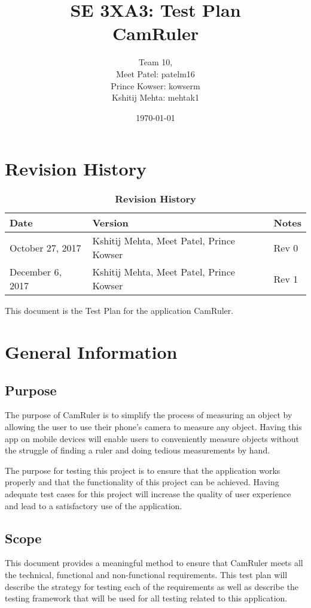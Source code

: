 \documentclass[12pt, titlepage]{article}
\title{SE 3XA3: Test Plan\\CamRuler}
\author{Team 10,
		\\ Meet Patel: patelm16
		\\ Prince Kowser: kowserm
		\\ Kshitij Mehta: mehtak1
}
\date{\today}
\begin{document}
\maketitle

\tableofcontents
\listoftables
\listoffigures

\newpage
 \section{Revision History}
\begin{table}[H]
\caption{\bf Revision History}
\begin{tabularx}{\textwidth}{p{4cm}p{2cm}X}
\toprule {\bf Date} & {\bf Version} & {\bf Notes}\\
\midrule
\midrule
October 27, 2017 & Kshitij Mehta, Meet Patel, Prince Kowser & Rev 0\\
\midrule
December 6, 2017 & Kshitij Mehta, Meet Patel, Prince Kowser & Rev 1\\
\bottomrule
\end{tabularx}
\end{table}

This document is the Test Plan for the application CamRuler.

\newpage


\section{General Information}

\subsection{Purpose}
The purpose of CamRuler is to simplify the process of measuring an object by allowing the user to use their phone’s camera to measure any object. Having this app on mobile devices will enable users to conveniently measure objects without the struggle of ﬁnding a ruler and doing tedious measurements by hand.

\noindent The purpose for testing this project is to ensure that the application works properly and that the functionality of this project can be achieved. Having adequate test cases for this project will increase the quality of user experience and lead to a satisfactory use of the application.

\subsection{Scope}
This document provides a meaningful method to ensure that CamRuler meets all the technical, functional and non-functional requirements. This test plan will describe the strategy for testing each of the requirements as well as describe the testing framework that will be used for all testing related to this application. 
\end{document}

